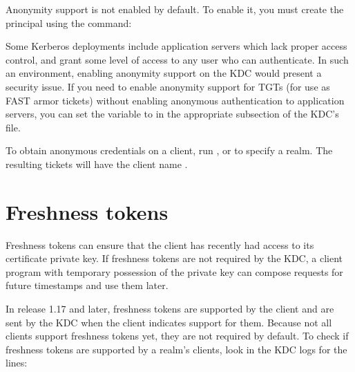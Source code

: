 \documentclass[letterpaper,10pt,english]{sphinxmanual}
\begin{document}
\sphinxAtStartPar
Anonymity support is not enabled by default.  To enable it, you must
create the principal  using the command:

\begin{sphinxVerbatim}[commandchars=\\\{\}]
  
\end{sphinxVerbatim}

\sphinxAtStartPar
Some Kerberos deployments include application servers which lack
proper access control, and grant some level of access to any user who
can authenticate.  In such an environment, enabling anonymity support
on the KDC would present a security issue.  If you need to enable
anonymity support for TGTs (for use as FAST armor tickets) without
enabling anonymous authentication to application servers, you can set
the variable  to  in the
appropriate {\hyperref[\detokenize{admin/conf_files/kdc_conf:kdc-realms}]{}} subsection of the KDC’s
{\hyperref[\detokenize{admin/conf_files/kdc_conf:kdc-conf-5}]{}} file.

\sphinxAtStartPar
To obtain anonymous credentials on a client, run , or
 to specify a realm.  The resulting tickets
will have the client name .


\section{Freshness tokens}
\label{\detokenize{admin/pkinit:freshness-tokens}}
\sphinxAtStartPar
Freshness tokens can ensure that the client has recently had access to
its certificate private key.  If freshness tokens are not required by
the KDC, a client program with temporary possession of the private key
can compose requests for future timestamps and use them later.

\sphinxAtStartPar
In release 1.17 and later, freshness tokens are supported by the
client and are sent by the KDC when the client indicates support for
them.  Because not all clients support freshness tokens yet, they are
not required by default.  To check if freshness tokens are supported
by a realm’s clients, look in the KDC logs for the lines:
\end{document}
